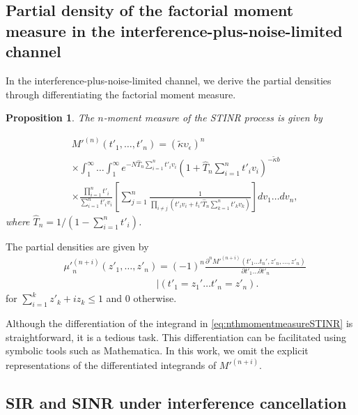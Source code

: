 \documentclass[lettersize,journal]{IEEEtran}
\newtheorem{prop}[theorem]{Proposition}
\begin{document}
\subsection{Partial density of the factorial moment measure in the interference-plus-noise-limited channel}


In the interference-plus-noise-limited channel, we derive the partial densities through differentiating the factorial moment measure.

\begin{prop}
  The $n$-moment measure of the STINR process is given by

  \begin{align}
    \label{eq:nthmomentmeasureSTINR}
      &M'^{(n)}(t'_1,\dots,t'_n) =\left(\tilde{\kappa} \upsilon_{\epsilon}\right)^n \nonumber\\
      &\times \int_1^{\infty}\dots\int_1^{\infty} e^{-N\hat{T}_n\sum\limits_{i=1}^nt'_iv_i} \left(1+\hat{T}_n\sum\limits_{i=1}^nt'_iv_i\right)^{-\tilde{\kappa}b} \nonumber\\
      &\times \frac{\prod\limits_{i=1}^nt'_i}{\sum\limits_{i=1}^nt'_iv_i}  \left[\sum\limits_{j=1}^n\frac{1}{\prod\limits_{i\neq j}\left(t'_i v_i+ t_i'\hat{T}_n\sum\limits_{k=1}^nt'_kv_k \right)} \right] dv_1 \dots dv_n,
    \end{align}
    where $\hat{T}_n= 1/(1-\sum_{i=1}^nt'_i)$.


\end{prop}
 
The partial densities are given by 
    \begin{align}
      \label{eq:differatemomentmeasure2}
     &{\mu'}_n^{(n+i)}(z'_1,\dots,z'_n)= (-1)^n \frac{\partial^n M'^{(n+i)}(t'_1\dots t_n', z'_n, \dots, z'_n)}{\partial t'_1 \dots \partial t'_n} \nonumber\\
      &\hspace{4cm}|(t'_1=z_1'\dots t'_n=z'_n).
    \end{align}
    for $\sum_{i=1}^kz'_k+iz_k \leq 1 $ and $0$ otherwise.

    Although the differentiation of the integrand in \eqref{eq:nthmomentmeasureSTINR} is straightforward, it is a tedious task. This differentiation can be facilitated using symbolic tools such as Mathematica. In this work, we omit the explicit representations of the differentiated integrands of $M'^{(n+i)}$.


\subsection{SIR and SINR under interference cancellation}
\end{document}
